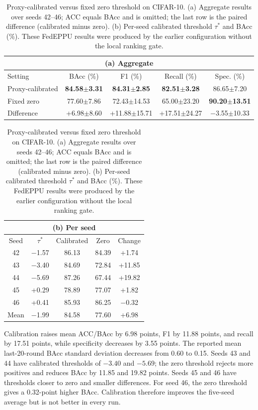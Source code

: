 \documentclass[lettersize,journal]{IEEEtran}
\begin{document}
\begin{table}[!t]
\centering
\caption{Proxy-calibrated versus fixed zero threshold on CIFAR-10. (a) Aggregate results over seeds 42--46; ACC equals BAcc and is omitted; the last row is the paired difference (calibrated minus zero). (b) Per-seed calibrated threshold $\tau^*$ and BAcc (\%). These FedEPPU results were produced by the earlier configuration without the local ranking gate.}
\label{tab:threshold}
\scriptsize
\begin{minipage}[t]{0.57\textwidth}
\centering
\setlength{\tabcolsep}{3pt}
\begin{tabular}{lcccc}
\toprule
\multicolumn{5}{c}{(a) Aggregate} \\
\midrule
Setting & BAcc (\%) & F1 (\%) & Recall (\%) & Spec. (\%) \\
\midrule
Proxy-calibrated & \textbf{84.58$\pm$3.31} & \textbf{84.31$\pm$2.85} & \textbf{82.51$\pm$3.28} & 86.65$\pm$7.20 \\
Fixed zero & 77.60$\pm$7.86 & 72.43$\pm$14.53 & 65.00$\pm$23.20 & \textbf{90.20$\pm$13.51} \\
Difference & +6.98$\pm$8.60 & +11.88$\pm$15.71 & +17.51$\pm$24.27 & $-$3.55$\pm$10.33 \\
\bottomrule
\end{tabular}
\end{minipage}\hfill
\begin{minipage}[t]{0.40\textwidth}
\centering
\setlength{\tabcolsep}{3pt}
\begin{tabular}{ccccc}
\toprule
\multicolumn{5}{c}{(b) Per seed} \\
\midrule
Seed & $\tau^*$ & Calibrated & Zero & Change \\
\midrule
42 & $-$1.57 & 86.13 & 84.39 & +1.74 \\
43 & $-$3.40 & 84.69 & 72.84 & +11.85 \\
44 & $-$5.69 & 87.26 & 67.44 & +19.82 \\
45 & +0.29 & 78.89 & 77.07 & +1.82 \\
46 & +0.41 & 85.93 & 86.25 & $-$0.32 \\
\midrule
Mean & $-$1.99 & 84.58 & 77.60 & +6.98 \\
\bottomrule
\end{tabular}
\end{minipage}
\end{table}

Calibration raises mean ACC/BAcc by 6.98 points, F1 by 11.88 points, and recall by 17.51 points, while specificity decreases by 3.55 points. The reported mean last-20-round BAcc standard deviation decreases from 0.60 to 0.15. Seeds 43 and 44 have calibrated thresholds of $-3.40$ and $-5.69$; the zero threshold rejects more positives and reduces BAcc by 11.85 and 19.82 points. Seeds 45 and 46 have thresholds closer to zero and smaller differences. For seed 46, the zero threshold gives a 0.32-point higher BAcc. Calibration therefore improves the five-seed average but is not better in every run.
\end{document}

